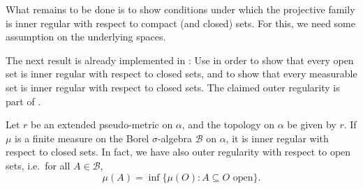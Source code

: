 \documentclass[lean]{DraftAFM}
\begin{document}
What remains to be done is to show conditions under which the
projective family is inner regular with respect to compact (and
closed) sets. For this, we need some assumption on the underlying
spaces.

The next result is already implemented in : Use
 in order to show
that every open set is inner regular with respect to closed sets, and
 to show that
every measurable set is inner regular with respect to closed sets.
The claimed outer regularity is part of
.

\begin{lemma}\label{l:pseude1}
  Let $r$ be an extended pseudo-metric on $\alpha$, and the topology
  on $\alpha$ be given by $r$. If $\mu$ is a finite measure on the
  Borel $\sigma$-algebra $\mathcal B$ on $\alpha$, it is inner regular
  with respect to closed sets. In fact, we have also outer regularity
  with respect to open sets, i.e.\ for all $A\in \mathcal B$,
  $$ \mu(A) = \inf \{ \mu(O) : A \subseteq O \text{ open}\}.$$
\end{lemma}
\end{document}
